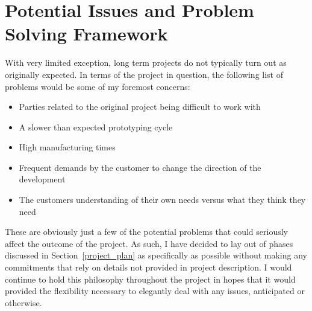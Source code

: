 \documentclass[11pt]{article}
\begin{document}
\section{Potential Issues and Problem Solving Framework}
With very limited exception, long term projects do not typically turn out as originally
expected. In terms of the project in question, the following list of problems would be
some of my foremost concerns:
\begin{itemize}
\item Parties related to the original project being difficult to work with
\item A slower than expected prototyping cycle
\item High manufacturing times
\item Frequent demands by the customer to change the direction of the development
\item The customers understanding of their own needs versus what they think they need
\end{itemize}
These are obviously just a few of the potential problems that could seriously affect
the outcome of the project. As such, I have decided to lay out of phases discussed in
Section~\ref{project_plan} as specifically as possible without making any commitments
that rely on details not provided in project description. I would continue to hold
this philosophy throughout the project in hopes that it would provided the flexibility
necessary to elegantly deal with any issues, anticipated or otherwise.
\end{document}
